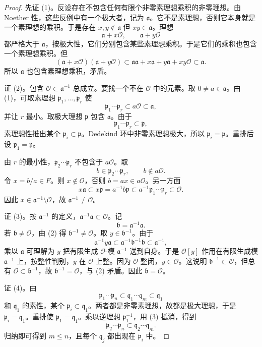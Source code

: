 \documentclass[11pt,a4paper,openany]{ctexbook}
\numberwithin{equation}{chapter}
\theoremstyle{plain}
\theoremstyle{definition}
\theoremstyle{remark}
\begin{document}
\begin{proof}
先证 (1)。反设存在不包含任何有限个非零素理想乘积的非零理想。由 Noether 性，这些反例中有一个极大者，记为 $\mathfrak a$。它不是素理想，否则它本身就是一个素理想的乘积。于是存在 $x,y\notin\mathfrak a$ 但 $xy\in\mathfrak a$。理想
\[
\mathfrak a+x\mathcal O,\qquad \mathfrak a+y\mathcal O
\]
都严格大于 $\mathfrak a$，按极大性，它们分别包含某些素理想乘积。于是它们的乘积也包含一个素理想乘积。但
\[
(\mathfrak a+x\mathcal O)(\mathfrak a+y\mathcal O)
\subset \mathfrak a\mathfrak a+x\mathfrak a+y\mathfrak a+xy\mathcal O\subset\mathfrak a.
\]
所以 $\mathfrak a$ 也包含素理想乘积，矛盾。

证 (2)。包含 $\mathcal O\subset\mathfrak a^{-1}$ 总成立。要找一个不在 $\mathcal O$ 中的元素。取 $0\ne a\in\mathfrak a$。由 (1)，可取素理想 $\mathfrak p_1,\dots,\mathfrak p_r$ 使
\[
\mathfrak p_1\cdots\mathfrak p_r\subset a\mathcal O\subset\mathfrak a,
\]
并让 $r$ 最小。取极大理想 $\mathfrak p$ 包含 $\mathfrak a$。由于
\[
\mathfrak p_1\cdots\mathfrak p_r\subset\mathfrak p,
\]
素理想性推出某个 $\mathfrak p_i\subset\mathfrak p$。Dedekind 环中非零素理想极大，所以 $\mathfrak p_i=\mathfrak p$。重排后设 $\mathfrak p_1=\mathfrak p$。

由 $r$ 的最小性，$\mathfrak p_2\cdots\mathfrak p_r$ 不包含于 $a\mathcal O$。取
\[
b\in \mathfrak p_2\cdots\mathfrak p_r,\qquad b\notin a\mathcal O.
\]
令 $x=b/a\in F$。则 $x\notin\mathcal O$，否则 $b=ax\in a\mathcal O$。另一方面
\[
x\mathfrak a\subset x\mathfrak p
=a^{-1}b\mathfrak p
\subset a^{-1}\mathfrak p_1\cdots\mathfrak p_r
\subset \mathcal O.
\]
因此 $x\in\mathfrak a^{-1}\setminus\mathcal O$，故 $\mathfrak a^{-1}\ne\mathcal O$。

证 (3)。按 $\mathfrak a^{-1}$ 的定义，$\mathfrak a^{-1}\mathfrak a\subset\mathcal O$。记
\[
\mathfrak b=\mathfrak a^{-1}\mathfrak a.
\]
若 $\mathfrak b\ne\mathcal O$，由 (2) 得 $\mathfrak b^{-1}\ne\mathcal O$。取 $y\in\mathfrak b^{-1}$。由于
\[
\mathfrak a^{-1}y\mathfrak a
\subset \mathfrak a^{-1}\mathfrak b^{-1}\mathfrak b
\subset \mathfrak a^{-1},
\]
乘以 $\mathfrak a$ 可理解为 $y$ 把有限生成 $\mathcal O$-模 $\mathfrak a^{-1}$ 送到自身。于是 $\mathcal O[y]$ 作用在有限生成模 $\mathfrak a^{-1}$ 上，按整性判别，$y$ 在 $\mathcal O$ 上整。因为 $\mathcal O$ 整闭，$y\in\mathcal O$。这说明 $\mathfrak b^{-1}\subset\mathcal O$，但总有 $\mathcal O\subset\mathfrak b^{-1}$，故 $\mathfrak b^{-1}=\mathcal O$，与 (2) 矛盾。因此 $\mathfrak b=\mathcal O$。

证 (4)。由
\[
\mathfrak p_1\cdots\mathfrak p_n\subset\mathfrak q_1\cdots\mathfrak q_m\subset\mathfrak q_1
\]
和 $\mathfrak q_1$ 的素性，某个 $\mathfrak p_i\subset\mathfrak q_1$。两者都是非零素理想，故都是极大理想，于是 $\mathfrak p_i=\mathfrak q_1$。重排使 $\mathfrak p_1=\mathfrak q_1$。乘以逆理想 $\mathfrak p_1^{-1}$，用 (3) 抵消，得到
\[
\mathfrak p_2\cdots\mathfrak p_n\subset\mathfrak q_2\cdots\mathfrak q_m.
\]
归纳即可得到 $m\le n$，且每个 $\mathfrak q_j$ 都出现在 $\mathfrak p_i$ 中。
\end{proof}
\end{document}
